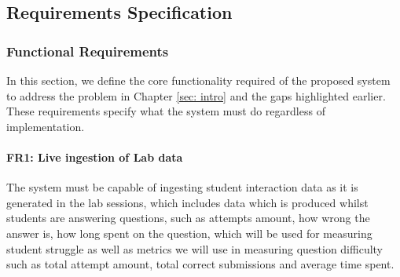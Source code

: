 






\subsection{Requirements Specification}

\subsubsection{Functional Requirements}
In this section, we define the core functionality required of the proposed system to address the problem in Chapter \ref{sec: intro} and the gaps highlighted earlier. These requirements specify what the system must do regardless of implementation.

\paragraph{FR1: Live ingestion of Lab data}
The system must be capable of ingesting student interaction data as it is generated in the lab sessions, which includes data which is produced whilst students are answering questions, such as attempts amount, how wrong the answer is, how long spent on the question, which will be used for measuring student struggle as well as metrics we will use in measuring question difficulty such as total attempt amount, total correct submissions and average time spent.

